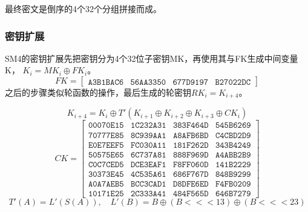 最终密文是倒序的4个32个分组拼接而成。

\subsubsection{密钥扩展}
SM4的密钥扩展先把密钥分为4个32位子密钥MK，再使用其与FK生成中间变量K，
$K_i = MK_i \oplus FK_i$。
$$
FK =
\begin{bmatrix}
\texttt{A3B1BAC6} & \texttt{56AA3350} & \texttt{677D9197} & \texttt{B27022DC}
\end{bmatrix}
$$
之后的步骤类似轮函数的操作，最后生成的轮密钥$RK_i=K_{i+4}$。

$$
K_{i+4} = K_i \oplus T'\left(K_{i+1} \oplus K_{i+2} \oplus K_{i+3} \oplus CK_i\right)
$$
$$
CK =
\begin{bmatrix}
\texttt{00070E15} & \texttt{1C232A31} & \texttt{383F464D} & \texttt{545B6269} \\
\texttt{70777E85} & \texttt{8C939AA1} & \texttt{A8AFB6BD} & \texttt{C4CBD2D9} \\
\texttt{E0E7EEF5} & \texttt{FC030A11} & \texttt{181F262D} & \texttt{343B4249} \\
\texttt{50575E65} & \texttt{6C737A81} & \texttt{888F969D} & \texttt{A4ABB2B9} \\
\texttt{C0C7CED5} & \texttt{DCE3EAF1} & \texttt{F8FF060D} & \texttt{141B2229} \\
\texttt{30373E45} & \texttt{4C535A61} & \texttt{686F767D} & \texttt{848B9299} \\
\texttt{A0A7AEB5} & \texttt{BCC3CAD1} & \texttt{D8DFE6ED} & \texttt{F4FB0209} \\
\texttt{10171E25} & \texttt{2C333A41} & \texttt{484F565D} & \texttt{646B7279}
\end{bmatrix}
$$
$$
T'(A) = L'(S(A)),\quad
L'(B) = B \oplus (B <<< 13) \oplus (B <<< 23)
$$

